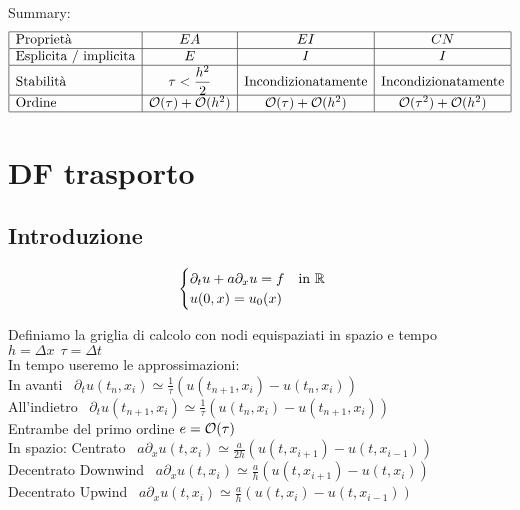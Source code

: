\documentclass{article}
\begin{document}
Summary:
\[
\begin{array}{|l|c|c|c|}
\hline
     \text{Proprietà} & EA & EI & CN  \\
     \hline
     \text{Esplicita / implicita} & E & I & I\\
     \hline
     \text{Stabilità} & \tau<\dfrac{h^2}{2} & \text{Incondizionatamente} & \text{Incondizionatamente}\\
     \hline
     \text{Ordine} & \mathcal O(\tau)+\mathcal O(h^2) & \mathcal O(\tau)+\mathcal O(h^2) & \mathcal O(\tau^2)+\mathcal O(h^2)\\
     \hline
\end{array}
\]

\newpage


\section{DF trasporto}

\subsection{Introduzione}

\[
\begin{cases}
    \partial_t u + a \partial_x u=f \ \ \text{ in } \mathbb R\\
    u(0,x)=u_0(x)
\end{cases}
\]
\phantom{}

Definiamo la griglia di calcolo con nodi equispaziati in spazio e tempo \ $h=\Delta x \ \ \tau = \Delta t$\\

In tempo useremo le approssimazioni:\\
In avanti \ $\partial_t u(t_n,x_i)\simeq \frac{1}{\tau} (u(t_{n+1},x_i) - u(t_n,x_i))$\\
All'indietro \ $\partial_t u(t_{n+1},x_i)\simeq \frac{1}{\tau} (u(t_n,x_i) - u(t_{n+1},x_i))$\\
Entrambe del primo ordine $e=\mathcal O(\tau)$\\

In spazio:
Centrato \ $a\partial_x u(t,x_i)\simeq \frac{a}{2h} (u(t,x_{i+1}) - u(t,x_{i-1}))$\\
Decentrato Downwind \ $a\partial_x u(t,x_i)\simeq \frac{a}{h} (u(t,x_{i+1}) - u(t,x_i))$\\
Decentrato Upwind \ $a\partial_x u(t,x_i)\simeq \frac{a}{h} (u(t,x_i) - u(t,x_{i-1}))$\\ \\
\end{document}

